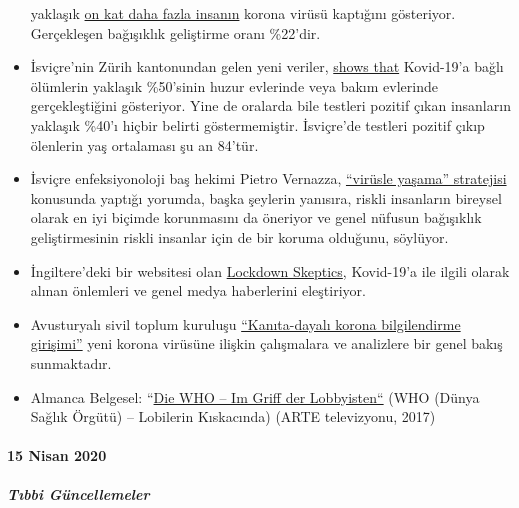 \begin{itemize}
  yaklaşık
  \href{https://www.tgcom24.mediaset.it/cronaca/a-robbio-pv-il-22-ha-o-ha-avuto-il-coronavirus-ok-del-sindaco-ai-test-per-tutti_17285128-202002a.shtml}{on
  kat daha fazla insanın} korona virüsü kaptığını gösteriyor.
  Gerçekleşen bağışıklık geliştirme oranı \%22'dir.
\item
  İsviçre'nin Zürih kantonundan gelen yeni veriler,
  \href{https://www.srf.ch/news/regional/zuerich-schaffhausen/corona-uebersicht-zh-und-sh-schlieren-als-zentrum-der-forschung-im-kampf-gegen-corona}{shows
  that} Kovid-19'a bağlı ölümlerin yaklaşık \%50'sinin huzur evlerinde
  veya bakım evlerinde gerçekleştiğini gösteriyor. Yine de oralarda bile
  testleri pozitif çıkan insanların yaklaşık \%40'ı hiçbir belirti
  göstermemiştir. İsviçre'de testleri pozitif çıkıp ölenlerin yaş
  ortalaması şu an 84'tür.
\item
  İsviçre enfeksiyonoloji baş hekimi Pietro Vernazza,
  \href{https://infekt.ch/2020/04/exitstrategie-lockdown/}{``virüsle
  yaşama'' stratejisi} konusunda yaptığı yorumda, başka şeylerin
  yanısıra, riskli insanların bireysel olarak en iyi biçimde korunmasını
  da öneriyor ve genel nüfusun bağışıklık geliştirmesinin riskli
  insanlar için de bir koruma olduğunu, söylüyor.
\item
  İngiltere'deki bir websitesi olan
  \href{https://lockdownsceptics.org/}{Lockdown Skeptics}, Kovid-19'a
  ile ilgili olarak alınan önlemleri ve genel medya haberlerini
  eleştiriyor.
\item
  Avusturyalı sivil toplum kuruluşu
  \href{https://www.initiative-corona.info/}{``Kanıta-dayalı korona
  bilgilendirme girişimi''} yeni korona virüsüne ilişkin çalışmalara ve
  analizlere bir genel bakış sunmaktadır.
\item
  Almanca Belgesel:
  ``\href{https://www.youtube.com/watch?v=dYlia_fQOLk}{Die WHO -- Im
  Griff der
  Lobbyisten}\href{https://www.youtube.com/watch?v=dYlia_fQOLk}{``} (WHO
  (Dünya Sağlık Örgütü) -- Lobilerin Kıskacında) (ARTE televizyonu,
  2017)
\end{itemize}

\hypertarget{15-nisan-2020}{%
\paragraph{15 Nisan 2020}\label{15-nisan-2020}}

\hypertarget{tux131bbi-guxfcncellemeler-3}{%
\subparagraph{\texorpdfstring{\textbf{Tıbbi
Güncellemeler}}{Tıbbi Güncellemeler}}\label{tux131bbi-guxfcncellemeler-3}}

